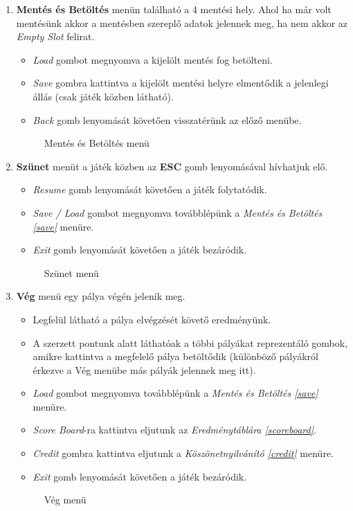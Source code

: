 \begin{enumerate}
	\item \label{save} \textbf{Mentés és Betöltés} menün található a 4 mentési hely. Ahol ha már volt mentésünk akkor a mentésben szereplő adatok jelennek meg, ha nem akkor az \textit{Empty Slot} felirat.   
	\begin{itemize}
		\item \textit{Load} gombot megnyomva a kijelölt mentés fog betölteni.
		\item \textit{Save} gombra kattintva a kijelölt mentési helyre elmentődik a jelenlegi állás (csak játék közben látható).
		\item \textit{Back} gomb lenyomását követően visszatérünk az előző menübe.
	\end{itemize}
	\begin{figure}[H]
		\noindent{}
		\caption{Mentés és Betöltés menü}
		\label{saveLoad}
	\end{figure}
	
	\item \label{pause} \textbf{Szünet} menüt a játék közben az \textbf{ESC} gomb lenyomásával hívhatjuk elő.
	\begin{itemize}
		\item \textit{Resume} gomb lenyomását követően a játék folytatódik.
		\item \textit{Save / Load} gombot megnyomva továbblépünk a \textit{Mentés és Betöltés \ref{save}} menüre.
		\item \textit{Exit} gomb lenyomását követően a játék bezáródik.
	\end{itemize}
	\begin{figure}[H]
		\noindent{}
		\caption{Szünet menü}
		\label{pauseF}
	\end{figure}
	
	\item \label{end} \textbf{Vég} menü egy pálya végén jelenik meg.
	\begin{itemize}
		\item Legfelül látható a pálya elvégzését követő eredményünk.
		\item A szerzett pontunk alatt láthatóak a többi pályákat reprezentáló gombok, amikre kattintva a megfelelő pálya betöltődik (különböző pályákról érkezve a Vég menübe más pályák jelennek meg itt).
		\item \textit{Load} gombot megnyomva továbblépünk a \textit{Mentés és Betöltés \ref{save}} menüre.
		\item \textit{Score Board}-ra kattintva eljutunk az \textit{Eredménytáblára \ref{scoreboard}}.
		\item \textit{Credit} gombra kattintva eljutunk a \textit{Köszönetnyilvánító \ref{credit}} menüre.
		\item \textit{Exit} gomb lenyomását követően a játék bezáródik.
	\end{itemize}
	\begin{figure}[H]
		\noindent{}
		\caption{Vég menü}
		\label{endF}
	\end{figure}
	

\end{enumerate}
